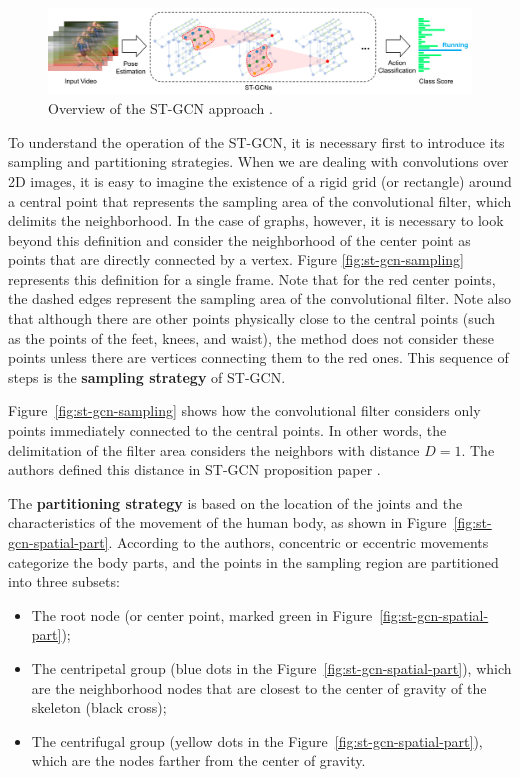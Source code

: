 \begin{figure}[!ht]
    \centering
    \includegraphics[width=1.0\textwidth]{images/st_gcn_workflow}
    \caption{Overview of the ST-GCN approach \cite[p. 3]{st-gcn-2018}.}
    \label{fig:st-gcn-workflow}
\end{figure}

To understand the operation of the ST-GCN, it is necessary first to introduce its sampling and partitioning strategies. When we are dealing with convolutions over 2D images, it is easy to imagine the existence of a rigid grid (or rectangle) around a central point that represents the sampling area of the convolutional filter, which delimits the neighborhood. In the case of graphs, however, it is necessary to look beyond this definition and consider the neighborhood of the center point as points that are directly connected by a vertex. Figure \ref{fig:st-gcn-sampling} represents this definition for a single frame. Note that for the red center points, the dashed edges represent the sampling area of the convolutional filter. Note also that although there are other points physically close to the central points (such as the points of the feet, knees, and waist), the method does not consider these points unless there are vertices connecting them to the red ones. This sequence of steps is the \textbf{sampling strategy} of ST-GCN. 

Figure~\ref{fig:st-gcn-sampling} shows how the convolutional filter considers only points immediately connected to the central points. In other words, the delimitation of the filter area considers the neighbors with distance $D = 1$. The authors defined this distance in ST-GCN proposition paper \cite{st-gcn-2018}. 

The \textbf{partitioning strategy} is based on the location of the joints and the characteristics of the movement of the human body, as shown in Figure~\ref{fig:st-gcn-spatial-part}. According to the authors, concentric or eccentric movements categorize the body parts, and the points in the sampling region are partitioned into three subsets: 
    
\begin{itemize}
    \item The root node (or center point, marked green in Figure~\ref{fig:st-gcn-spatial-part});
    \item The centripetal group (blue dots in the Figure~\ref{fig:st-gcn-spatial-part}), which are the neighborhood nodes that are closest to the center of gravity of the skeleton (black cross);
    \item The centrifugal group (yellow dots in the Figure~\ref{fig:st-gcn-spatial-part}), which are the nodes farther from the center of gravity.
\end{itemize}

